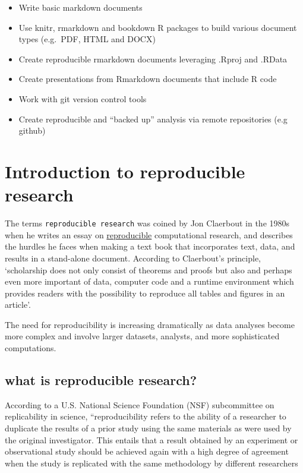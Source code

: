 \documentclass[
]{book}
\providecommand{\tightlist}{%
  \setlength{\itemsep}{0pt}\setlength{\parskip}{0pt}}
\begin{document}
\begin{itemize}
\tightlist
\item
  Write basic markdown documents\\
\item
  Use knitr, rmarkdown and bookdown R packages to build various document types (e.g.~PDF, HTML and DOCX)\\
\item
  Create reproducible rmarkdown documents leveraging .Rproj and .RData\\
\item
  Create presentations from Rmarkdown documents that include R code\\
\item
  Work with git version control tools\\
\item
  Create reproducible and ``backed up'' analysis via remote repositories (e.g github)
\end{itemize}

\hypertarget{introduction-to-reproducible-research}{%
\chapter{Introduction to reproducible research}\label{introduction-to-reproducible-research}}

The terms \texttt{reproducible\ research} was coined by Jon Claerbout in the 1980s when he writes an essay on \href{http://sepwww.stanford.edu/sep/jon/reproducible.html}{reproducible} computational research, and describes the hurdles he faces when making a text book that incorporates text, data, and results in a stand-alone document. According to Claerbout's principle, `scholarship does not only consist of theorems and proofs but also and perhaps even more important of data, computer code and a runtime environment which provides readers with the possibility to reproduce all tables and figures in an article'.

The need for reproducibility is increasing dramatically as data analyses become more complex and involve larger datasets, analysts, and more sophisticated computations.

\hypertarget{what-is-reproducible-research}{%
\section{what is reproducible research?}\label{what-is-reproducible-research}}

According to a U.S. National Science Foundation (NSF) subcommittee on replicability in science, ``reproducibility refers to the ability of a researcher to duplicate the results of a prior study using the same materials as were used by the original investigator. This entails that a result obtained by an experiment or observational study should be achieved again with a high degree of agreement when the study is replicated with the same methodology by different researchers
\end{document}
